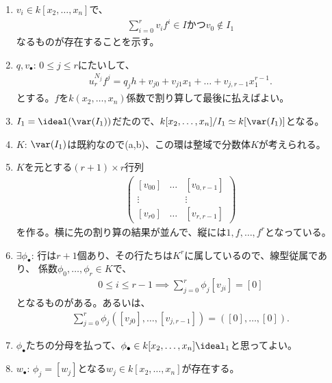 \begin{enumerate}
\begin{enumerate}
\begin{enumerate}
\begin{enumerate}
        \item
        \begin{framed}
          $v_i \in k[x_2,\dots,x_n]$で、
          \begin{align}
            \sum_{i=0}^r v_i f^i \in I かつ
            v_0 \notin I_1
          \end{align}
          なるものが存在することを示す。
        \end{framed}
        \item
        $q,v_\bullet$:
        $0\le j \le r$にたいして、
        \begin{align}
          u_r^{N_j} f^j = q_j h+ v_{j0}+ v_{j1}x_1 + \dots + v_{j,r-1}x_1^{r-1}.
        \end{align}
        とする。$f$を$k(x_2,\dots,x_n)$係数で割り算して最後に払えばよい。
        \item
        $I_1 = \ideal(\var(I_1))$だたので、$k[x_2,\dots,x_n]/I_1 \simeq k[\var(I_1)]$となる。
        \item $K$:
        $\var(I_1)$は既約なので(a,b)、この環は整域で分数体$K$が考えられる。
        \item
        $K$を元とする$(r+1)\times r$行列
        \begin{align}
          \begin{pmatrix}
            [v_{00}] & \ldots & [v_{0,r-1}]\\
            \vdots & & \vdots \\
            [v_{r0}] & \ldots & [v_{r,r-1}]
          \end{pmatrix}
        \end{align}
        を作る。横に先の割り算の結果が並んで、縦には$1,f,\dots,f^r$となっている。
        \item $\exists \phi_\bullet$:
        行は$r+1$個あり、その行たちは$K^r$に属しているので、線型従属であり、
        係数$\phi_0,\dots,\phi_r \in K$で、
        \begin{align}
          0\le i \le r-1 \implies \sum_{j=0}^r \phi_j [v_{ji}] = [0]
        \end{align}
        となるものがある。あるいは、
        \begin{align}
          \sum_{j=0}^r \phi_j ([v_{j0}] ,\dots, [v_{j,r-1}]) = ([0],\dots,[0]).
        \end{align}
        \item
        $\phi_\bullet$たちの分母を払って、$\phi_\bullet \in k[x_2,\dots,x_n] \ideal_1$と思ってよい。
        \item
        $w_\bullet$: $\phi_j = [w_j]$となる$w_j \in k[x_2,\dots,x_n]$が存在する。

\end{enumerate}
\end{enumerate}
\end{enumerate}
\end{enumerate}
